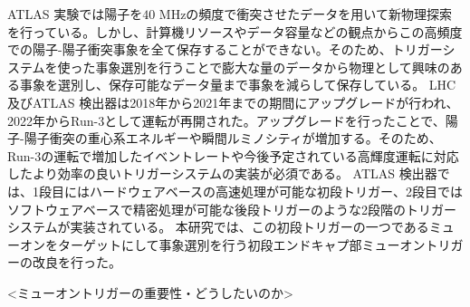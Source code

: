 ATLAS 実験では陽子を$40$ MHzの頻度で衝突させたデータを用いて新物理探索を行っている。しかし、計算機リソースやデータ容量などの観点からこの高頻度での陽子-陽子衝突事象を全て保存することができない。そのため、トリガーシステムを使った事象選別を行うことで膨大な量のデータから物理として興味のある事象を選別し、保存可能なデータ量まで事象を減らして保存している。
LHC及びATLAS 検出器は2018年から2021年までの期間にアップグレードが行われ、2022年からRun-3として運転が再開された。アップグレードを行ったことで、陽子-陽子衝突の重心系エネルギーや瞬間ルミノシティが増加する。そのため、Run-3の運転で増加したイベントレートや今後予定されている高輝度運転に対応したより効率の良いトリガーシステムの実装が必須である。
ATLAS 検出器では、1段目にはハードウェアベースの高速処理が可能な初段トリガー、2段目ではソフトウェアベースで精密処理が可能な後段トリガーのような2段階のトリガーシステムが実装されている。
本研究では、この初段トリガーの一つであるミューオンをターゲットにして事象選別を行う初段エンドキャプ部ミューオントリガーの改良を行った。

<ミューオントリガーの重要性・どうしたいのか>





